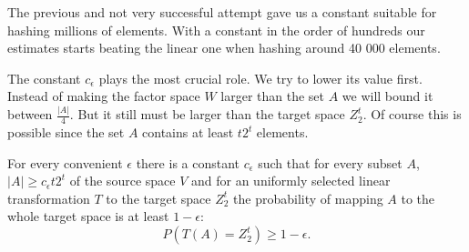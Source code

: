 The previous and not very successful attempt gave us a constant suitable for hashing millions of elements. With a constant in the order of hundreds our estimates starts beating the linear one when hashing around 40 000 elements.

The constant $c_\epsilon$ plays the most crucial role. We try to lower its value first. Instead of making the factor space $W$ larger than the set $A$ we will bound it between $\frac{|A|}{4}$. But it still must be larger than the target space $Z_2^t$. Of course this is possible since the set $A$ contains at least $t2^t$ elements.

\begin{remark}
For every convenient $\epsilon$ there is a constant $c_\epsilon$ such that for every subset $A$, $|A| \geq c_\epsilon t 2^t$ of the source space $V$ and for an uniformly selected linear transformation $T$ to the target space $Z_2^t$ the probability of mapping $A$ to the whole target space is at least $1-\epsilon$:
\begin{displaymath}
P(T(A) = Z_2^t) \geq 1 - \epsilon \textit{.}
\end{displaymath}
\end{remark}
